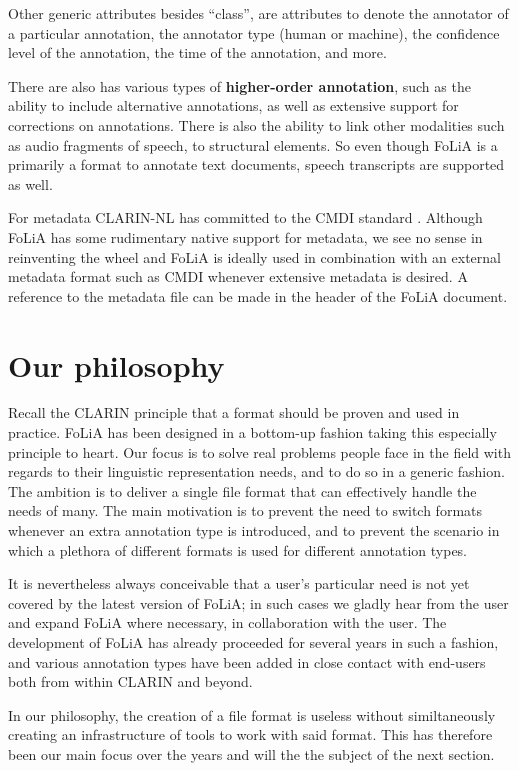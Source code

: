 Other generic attributes besides ``class'', are attributes to denote the
annotator of a particular annotation, the annotator type (human or machine),
the confidence level of the annotation, the time of the annotation, and more.

There are also has various types of \textbf{higher-order annotation}, such as
the ability to include alternative annotations, as well as extensive support
for corrections on annotations. There is also the ability to link other
modalities such as audio fragments of speech, to structural elements. So even
though FoLiA is a primarily a format to annotate text documents, speech
transcripts are supported as well. 

For metadata CLARIN-NL has committed to the CMDI standard \cite{CMDI}.
Although FoLiA has some rudimentary native support for metadata, we see no
sense in reinventing the wheel and FoLiA is ideally used in combination with an
external metadata format such as CMDI whenever extensive metadata is desired. A
reference to the metadata file can be made in the header of the FoLiA document.

\section{Our philosophy}

Recall the CLARIN principle that a format should be proven and used in
practice. FoLiA has been designed in a bottom-up fashion taking this especially
principle to heart. Our focus is to solve real problems people face in the field
with regards to their linguistic representation needs, and to do so in a
generic fashion. The ambition is to deliver a single file format that can
effectively handle the needs of many. The main motivation is to prevent the
need to switch formats whenever an extra annotation type is introduced, and to
prevent the scenario in which a plethora of different formats is used for
different annotation types.

It is nevertheless always conceivable that a user's particular need is not yet
covered by the latest version of FoLiA; in such cases we gladly hear from the
user and expand FoLiA where necessary, in collaboration with the user. The
development of FoLiA has already proceeded for several years in such a fashion,
and various annotation types have been added in close contact with end-users
both from within CLARIN and beyond.

In our philosophy, the creation of a file format is useless without
similtaneously creating an infrastructure of tools to work with said format.
This has therefore been our main focus over the years and will the the subject
of the next section.

